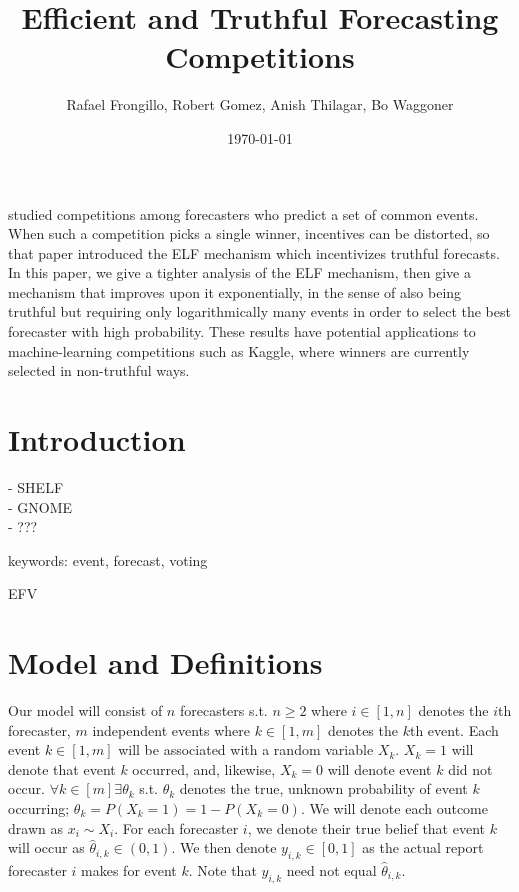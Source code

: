 \documentclass[letterpaper,12pt]{article}
\renewenvironment{abstract}
 {
  \begin{center}
  \vspace{3em} \bfseries \abstractname\vspace{0em}\vspace{0pt}
  \end{center}
  \list{}{%
    \setlength{\leftmargin}{20mm}%
    \setlength{\rightmargin}{\leftmargin}%
  }%
  \item\relax}
 {\endlist}
\newcommand{\1}{\mathbbm{1}}
\begin{document}
\title{Efficient and Truthful Forecasting Competitions}
\author{Rafael Frongillo, Robert Gomez, Anish Thilagar, Bo Waggoner}
\date{\today}
\maketitle


\begin{abstract}
   \citet{witkowski2018incentive} studied competitions among forecasters who predict a set of common events.
   When such a competition picks a single winner, incentives can be distorted, so that paper introduced the ELF mechanism which incentivizes truthful forecasts.
   In this paper, we give a tighter analysis of the ELF mechanism, then give a mechanism that improves upon it exponentially, in the sense of also being truthful but requiring only logarithmically many events in order to select the best forecaster with high probability.
   These results have potential applications to machine-learning competitions such as Kaggle, where winners are currently selected in non-truthful ways. 
\end{abstract}


\section{Introduction}
- SHELF\\
- GNOME\\
- ???


keywords: event, forecast, voting

EFV

\section{Model and Definitions}
Our model will consist of $n$ forecasters s.t. $n \ge 2$ where $i \in [1,n]$ denotes the $i$th forecaster, $m$ independent events where $k \in [1,m]$ denotes the $k$th event. Each event $k \in [1,m]$ will be associated with a random variable $X_k$. $X_k = 1$ will denote that event $k$ occurred, and, likewise, $X_k = 0$ will denote event $k$ did not occur. $\forall k \in [m] \exists \theta_k$ s.t. $\theta_k$ denotes the true, unknown probability of event $k$ occurring;  $\theta_k = P(X_k = 1) = 1 - P(X_k = 0)$. We will denote each outcome drawn as $x_i \sim X_i$. For each forecaster $i$, we denote their true belief that event $k$ will occur as $\hat{\theta}_{i,k} \in (0,1)$. We then denote $y_{i,k} \in [0,1]$ as the actual report forecaster $i$ makes for event $k$. Note that $y_{i,k}$ need not equal $\hat{\theta}_{i,k}$. 
\end{document}

